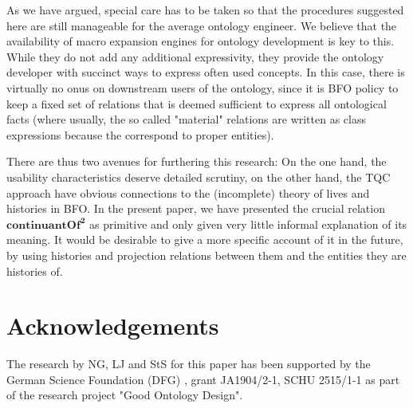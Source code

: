 \documentclass{ao2e}
\newcommand{\mirel}[1]{\ensuremath{\mathrm{\mathbf{#1}}}}
\newcommand{\mrel}[2]{\mirel{#1^#2}}
\newcommand{\mrelb}[1]{\mrel{#1}{2}}
\begin{document}
As we have argued, special care has to be taken so that the procedures suggested
here are still manageable for the average ontology engineer. We
believe that the availability of macro expansion engines for ontology
development is key to this. While they do not add any additional expressivity, they
provide the ontology developer with succinct ways to express often used
concepts. In this case, there is virtually no onus on downstream users of the
ontology, since it is BFO policy to keep a fixed set of relations that is deemed
sufficient to express all ontological facts (where usually, the so called
"material" relations are written as class expressions because the correspond to
proper entities). 

There are thus two avenues for furthering this research: On the one hand, the
usability characteristics deserve detailed scrutiny, on the other hand, the
TQC approach have obvious connections to the (incomplete) theory of lives and
histories in BFO.
In the present paper, we have presented the crucial
relation \mrelb{continuantOf} as primitive and only given very little informal
explanation of its meaning. It would be desirable to give a more specific account of it in the
future, by using histories and projection relations between them and the
entities they are histories of.
\section*{Acknowledgements}
The research by NG, LJ and StS for this paper has been supported by the German
Science Foundation (DFG) , grant
JA1904/2-1, SCHU 2515/1-1 as part of the research project "Good Ontology Design".


\end{document}
